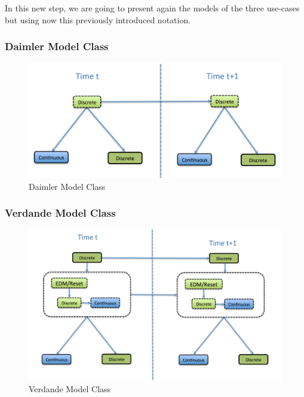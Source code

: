 In this new step, we are going to present again the models of the three use-cases but using now this previously introduced notation. 

\subsubsection*{Daimler Model Class}

\begin{figure}
\begin{center}
\caption{\label{Figure:DaimlerModelClass} Daimler Model Class}
\includegraphics[scale=0.4]{./figures/DaimlerModelClass}
\end{center}
\end{figure}

\subsubsection*{Verdande Model Class}

\begin{figure}
\begin{center}
\caption{\label{Figure:VerdandeModelClass} Verdande Model Class}
\includegraphics[scale=0.4]{./figures/VerdandeModelClass}
\end{center}
\end{figure}


